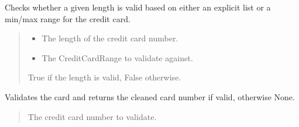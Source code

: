 \documentclass[letterpaper,10pt,english]{sphinxmanual}
\begin{document}
\begin{fulllineitems}
\begin{fulllineitems}
\label{\detokenize{apache_commons_validator_python.routines:apache_commons_validator_python.routines.credit_card_validator.CreditCardValidator.valid_length}}
\pysigstartsignatures
{}
\pysigstopsignatures
\sphinxAtStartPar
Checks whether a given length is valid based on either an explicit list or a
min/max range for the credit card.
\begin{quote}\begin{description}
\begin{itemize}
\item {} 
\sphinxAtStartPar
{} \textendash{} The length of the credit card number.

\item {} 
\sphinxAtStartPar
{} \textendash{} The CreditCardRange to validate against.

\end{itemize}

\sphinxAtStartPar
True if the length is valid, False otherwise.

\end{description}\end{quote}

\end{fulllineitems}


\begin{fulllineitems}
\label{\detokenize{apache_commons_validator_python.routines:apache_commons_validator_python.routines.credit_card_validator.CreditCardValidator.validate}}
\pysigstartsignatures
{}
\pysigstopsignatures
\sphinxAtStartPar
Validates the card and returns the cleaned card number if valid, otherwise
None.
\begin{quote}\begin{description}
\sphinxAtStartPar
{} \textendash{} The credit card number to validate.


\end{description}
\end{quote}
\end{fulllineitems}
\end{fulllineitems}
\end{document}
